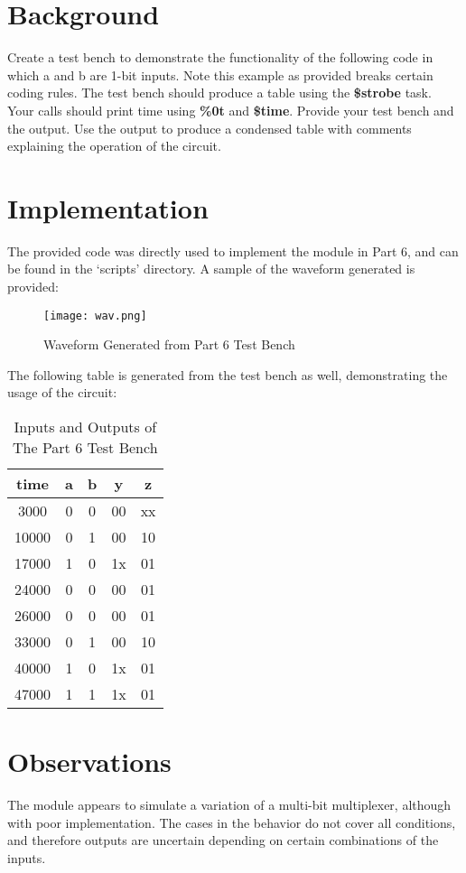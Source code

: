 \documentclass[paper=usletter, fontsize=12pt]{article}
\begin{document}
    \vspace{-0.1in}

    \section{Background}
    Create a test bench to demonstrate the functionality of the following code in which a and b are 1-bit inputs. Note this example as provided breaks certain coding rules. The test bench should produce a table using the \textbf{\$strobe} task. Your calls should print time using \textbf{\%0t} and \textbf{\$time}. Provide your test bench and the output. Use the output to produce a condensed table with comments explaining the operation of the circuit.

    \section{Implementation}
    The provided code was directly used to implement the module in Part 6, and can be found in the `scripts' directory. A sample of the waveform generated is provided:

    \begin{figure}[ht]
        \begin{center}
            \texttt{[image: wav.png]}
            \caption{Waveform Generated from Part 6 Test Bench} \label{fig:wav}
        \end{center}
    \end{figure}

    The following table is generated from the test bench as well, demonstrating the usage of the circuit:

    \begin{table}[h]

        \caption{Inputs and Outputs of The Part 6 Test Bench}
        \centering
        \begin{tabular*}{200pt}{@{\extracolsep{\fill}} ccccc}

            \textbf{time} & \textbf{a} & \textbf{b} & \textbf{y} & \textbf{z} \\
            \hline
             3000 & 0 & 0 & 00 & xx \\
            10000 & 0 & 1 & 00 & 10 \\
            17000 & 1 & 0 & 1x & 01 \\
            24000 & 0 & 0 & 00 & 01 \\
            26000 & 0 & 0 & 00 & 01 \\
            33000 & 0 & 1 & 00 & 10 \\
            40000 & 1 & 0 & 1x & 01 \\
            47000 & 1 & 1 & 1x & 01 \\
        \end{tabular*}
    \end{table}

    \section{Observations}
    The module appears to simulate a variation of a multi-bit multiplexer, although with poor implementation. The cases in the behavior do not cover all conditions, and therefore outputs are uncertain depending on certain combinations of the inputs.
\end{document}
